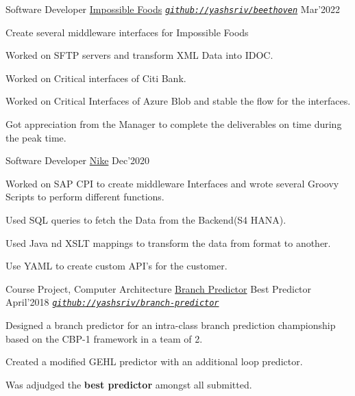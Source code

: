 
\begin{cventries}

  \cventry
  {Software Developer}
  {\href{https://github.com/yashsriv/beethoven}{Impossible Foods}}
  {\emph{\texttt{\href{https://github.com/yashsriv/beethoven}{github://yashsriv/beethoven}}}}
  {Mar'2022}
  {
    \begin{cvitems}
    \item Create several middleware interfaces for Impossible Foods
    \item Worked on SFTP servers and transform XML Data into IDOC.
    \item Worked on Critical interfaces of Citi Bank.
    \item Worked on Critical Interfaces of Azure Blob and stable the flow for the interfaces.
    \item Got appreciation from the Manager to complete the deliverables on time during the peak time.
    \end{cvitems}
  }

  \cventry
  {Software Developer}
  {\href{https://github.com/yashsriv/networks-video-stream}{Nike}}
  {Dec'2020}
  {
    \begin{cvitems}
    \item Worked on SAP CPI to create middleware Interfaces and wrote several Groovy Scripts to perform different functions. 
    \item Used SQL queries to fetch the Data from the Backend(S4 HANA).
    \item Used Java nd XSLT mappings to transform the data from format to another.
    \item Use YAML to create custom API's for the customer.
    \end{cvitems}
  }

  \smallcventry
  {Course Project, Computer Architecture}
  {\href{https://github.com/yashsriv/branch-predictor/blob/master/report/main.pdf}{Branch Predictor}}
  {Best Predictor}
  {April'2018}
  {\emph{\texttt{\href{https://github.com/yashsriv/branch-predictor/blob/master/report/main.pdf}{github://yashsriv/branch-predictor}}}}
  {
    \begin{cvitems}
    \item Designed a branch predictor for an intra-class branch prediction
      championship based on the CBP-1 framework in a team of 2.
    \item Created a modified GEHL predictor with an additional loop predictor.
    \item Was adjudged the \textbf{best predictor} amongst all submitted.
    \end{cvitems}
  }


\end{cventries}
